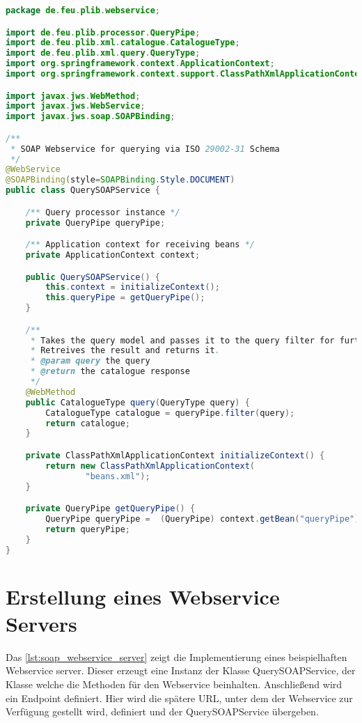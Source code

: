\begin{lstlisting}[caption=SOAP Webservice Klasse zum Senden eines Queries, language=Java, label=lst:soap_webservice_send_query]
package de.feu.plib.webservice;

import de.feu.plib.processor.QueryPipe;
import de.feu.plib.xml.catalogue.CatalogueType;
import de.feu.plib.xml.query.QueryType;
import org.springframework.context.ApplicationContext;
import org.springframework.context.support.ClassPathXmlApplicationContext;

import javax.jws.WebMethod;
import javax.jws.WebService;
import javax.jws.soap.SOAPBinding;

/**
 * SOAP Webservice for querying via ISO 29002-31 Schema
 */
@WebService
@SOAPBinding(style=SOAPBinding.Style.DOCUMENT)
public class QuerySOAPService {

    /** Query processor instance */
    private QueryPipe queryPipe;

    /** Application context for receiving beans */
    private ApplicationContext context;

    public QuerySOAPService() {
        this.context = initializeContext();
        this.queryPipe = getQueryPipe();
    }

    /**
     * Takes the query model and passes it to the query filter for further processing.
     * Retreives the result and returns it.
     * @param query the query
     * @return the catalogue response
     */
    @WebMethod
    public CatalogueType query(QueryType query) {
        CatalogueType catalogue = queryPipe.filter(query);
        return catalogue;
    }

    private ClassPathXmlApplicationContext initializeContext() {
        return new ClassPathXmlApplicationContext(
                "beans.xml");
    }

    private QueryPipe getQueryPipe() {
        QueryPipe queryPipe =  (QueryPipe) context.getBean("queryPipe");
        return queryPipe;
    }
}
 \end{lstlisting}  
 
\section{Erstellung eines Webservice Servers}

Das \autoref{lst:soap_webservice_server} zeigt die Implementierung eines beispielhaften Webservice server. Dieser erzeugt eine Instanz der Klasse QuerySOAPService, der Klasse welche die Methoden für den Webservice beinhalten. Anschließend wird ein Endpoint definiert. Hier wird die spätere \gls{URL}, unter dem der Webservice zur Verfügung gestellt wird, definiert und der QuerySOAPService übergeben. 

